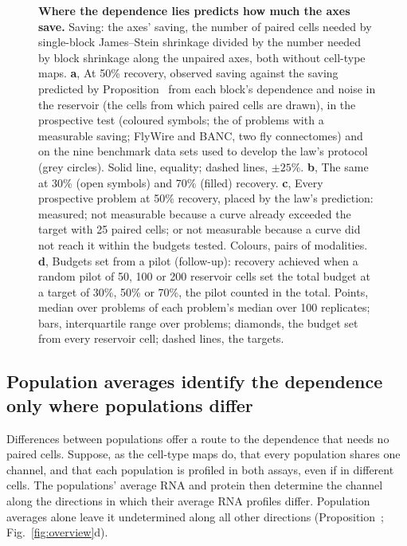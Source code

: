 \documentclass[pdflatex,sn-vancouver-num,iicol]{sn-jnl}
\begin{document}
\begin{figure}[tp]
\centering

\caption{\textbf{Where the dependence lies predicts how much the axes save.} Saving: the axes' saving, the number of paired cells needed by single-block James--Stein shrinkage divided by the number needed by block shrinkage along the unpaired axes, both without cell-type maps.
\textbf{a}, At 50\% recovery, observed saving against the saving predicted by Proposition~ from each block's dependence and noise in the reservoir (the cells from which paired cells are drawn), in the prospective test (coloured symbols; the \PredNEstimable{} of \PredNProblems{} problems with a measurable saving; FlyWire and BANC, two fly connectomes) and on the nine benchmark data sets used to develop the law's protocol (grey circles). Solid line, equality; dashed lines, $\pm25\%$.
\textbf{b}, The same at 30\% (open symbols) and 70\% (filled) recovery.
\textbf{c}, Every prospective problem at 50\% recovery, placed by the law's prediction: measured; not measurable because a curve already exceeded the target with 25 paired cells; or not measurable because a curve did not reach it within the budgets tested. Colours, pairs of modalities.
\textbf{d}, Budgets set from a pilot (follow-up): recovery achieved when a random pilot of 50, 100 or 200 reservoir cells set the total budget at a target of 30\%, 50\% or 70\%, the pilot counted in the total. Points, median over problems of each problem's median over 100 replicates; bars, interquartile range over problems; diamonds, the budget set from every reservoir cell; dashed lines, the targets.}
\label{fig:pred}
\end{figure}

\subsection{Population averages identify the dependence only where populations differ}
Differences between populations offer a route to the dependence that needs no paired cells. Suppose, as the cell-type maps do, that every population shares one channel, and that each population is profiled in both assays, even if in different cells. The populations' average RNA and protein then determine the channel along the directions in which their average RNA profiles differ. Population averages alone leave it undetermined along all other directions (Proposition~; Fig.~\ref{fig:overview}d).
\end{document}
